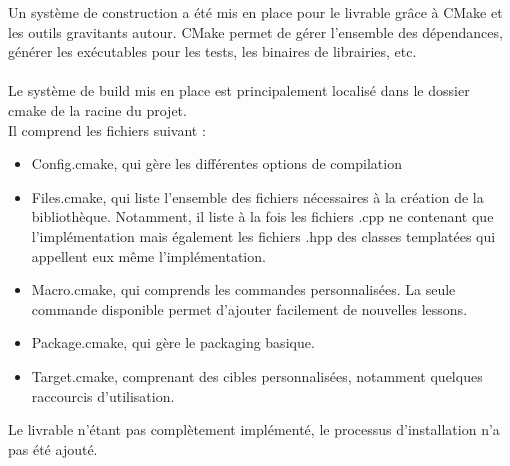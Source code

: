 Un système de construction a été mis en place pour le livrable grâce à CMake et les outils gravitants autour.
CMake permet de gérer l'ensemble des dépendances, générer les exécutables pour les tests, les binaires de librairies, etc.\\\\

Le système de build mis en place est principalement localisé dans le dossier cmake de la racine du projet.\\
Il comprend les fichiers suivant :
\begin{itemize}
\item Config.cmake, qui gère les différentes options de compilation
\item Files.cmake, qui liste l'ensemble des fichiers nécessaires à la création de la bibliothèque. Notamment, il liste à la fois les fichiers .cpp ne contenant que l'implémentation mais également les fichiers .hpp des classes templatées qui appellent eux même l'implémentation.
\item Macro.cmake, qui comprends les commandes personnalisées. La seule commande disponible permet d'ajouter facilement de nouvelles lessons.
\item Package.cmake, qui gère le packaging basique.
\item Target.cmake, comprenant des cibles personnalisées, notamment quelques raccourcis d'utilisation.
\end{itemize}

Le livrable n'étant pas complètement implémenté, le processus d'installation n'a pas été ajouté.
